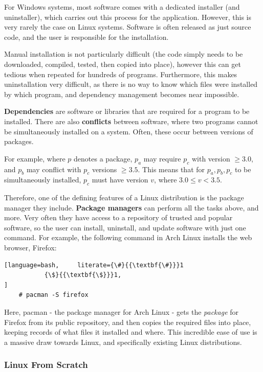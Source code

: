 \documentclass[10pt]{article}
\begin{document}
For Windows systems, most software comes with a dedicated installer (and uninstaller), which carries out this process for the application. However, this is very rarely the case on Linux systems. Software is often released as just source code, and the user is responsible for the installation.

Manual installation is not particularly difficult (the code simply needs to be downloaded, compiled, tested, then copied into place), however this can get tedious when repeated for hundreds of programs. Furthermore, this makes uninstallation very difficult, as there is no way to know which files were installed by which program, and dependency management becomes near impossible.

\textbf{Dependencies} are software or libraries that are required for a program to be installed. There are also \textbf{conflicts} between software, where two programs cannot be simultaneously installed on a system. Often, these occur between versions of packages. 

For example, where $p$ denotes a package, $p_a$ may require $p_c$ with version $\geq 3.0$, and $p_b$ may conflict with $p_c$ versions $\geq 3.5$. This means that for $p_a, p_b, p_c$ to be simultaneously installed, $p_c$ must have version $v$, where $3.0 \leq v < 3.5$.

Therefore, one of the defining features of a Linux distribution is the package manager they include. \textbf{Package managers} can perform all the tasks above, and more. Very often they have access to a repository of trusted and popular software, so the user can install, uninstall, and update software with just one command. For example, the following command in Arch Linux installs the web browser, Firefox:

\begin{lstlisting}[language=bash,     literate={\#}{{\textbf{\#}}}1
           {\$}{{\textbf{\$}}}1,
]
    # pacman -S firefox
\end{lstlisting}

Here, pacman - the package manager for Arch Linux \cite{ArchWikiPacman} - gets the \textit{package} for Firefox from its public repository, and then copies the required files into place, keeping records of what files it installed and where. This incredible ease of use is a massive draw towards Linux, and specifically existing Linux distributions.

\subsubsection{Linux From Scratch}
\end{document}
